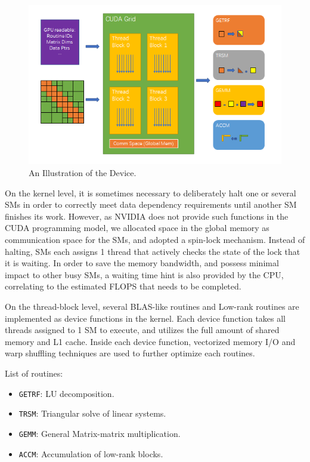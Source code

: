 \documentclass[sigconf]{acmart}
\begin{document}
\begin{figure}[ht]
  \centering
  \includegraphics[width=\linewidth]{device_illust}
  \caption{An Illustration of the Device.}
\end{figure}

On the kernel level, it is sometimes necessary to deliberately halt one or several SMs in order to correctly meet data dependency requirements until another SM finishes its work. However, as NVIDIA does not provide such functions in the CUDA programming model, we allocated space in the global memory as communication space for the SMs, and adopted a spin-lock mechanism. Instead of halting, SMs each assigns 1 thread that actively checks the state of the lock that it is waiting. In order to save the memory bandwidth, and possess minimal impact to other busy SMs, a waiting time hint is also provided by the CPU, correlating to the estimated FLOPS that needs to be completed. 

On the thread-block level, several BLAS-like routines and Low-rank routines are implemented as device functions in the kernel. Each device function takes all threads assigned to 1 SM to execute, and utilizes the full amount of shared memory and L1 cache. Inside each device function, vectorized memory I/O and warp shuffling techniques are used to further optimize each routines.

List of routines:

\begin{itemize}
    \item {\verb|GETRF|}: LU decomposition.
    \item {\verb|TRSM|}: Triangular solve of linear systems.
    \item {\verb|GEMM|}: General Matrix-matrix multiplication.
    \item {\verb|ACCM|}: Accumulation of low-rank blocks.
\end{itemize}
\end{document}
